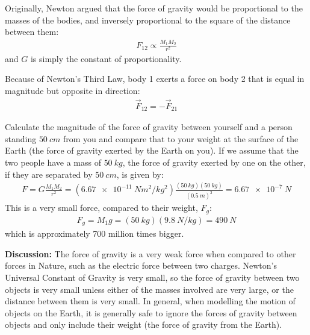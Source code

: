 Originally, Newton argued that the force of gravity would be proportional to the masses of the bodies, and inversely proportional to the square of the distance between them:
\begin{align*}
F_{12}\propto \frac{M_1M_2}{r^2}
\end{align*}
and $G$ is simply the constant of proportionality.

Because of Newton's Third Law, body 1 exerts a force on body 2 that is equal in magnitude but opposite in direction:
\begin{align*}
\vec F_{12} = -\vec F_{21}
\end{align*} 

\begin{example}{Calculate the magnitude of the force of gravity between yourself and a person standing $\SI{50}{cm}$ from you and compare that to your weight at the surface of the Earth (the force of gravity exerted by the Earth on you).}
If we assume that the two people have a mass of $\SI{50}{kg}$, the force of gravity exerted by one on the other, if they are separated by $\SI{50}{cm}$, is given by:
\begin{align*}
F=G\frac{M_1M_2}{r^2}=(\SI{6.67e-11}{Nm^2/kg^2})\frac{(\SI{50}{kg})(\SI{50}{kg})}{(\SI{0.5}{m})^2}=\SI{6.67e-7}{N}
\end{align*}
This is a very small force, compared to their weight, $F_g$:
\begin{align*}
F_g=M_1g=(\SI{50}{kg})(\SI{9.8}{N/kg})=\SI{490}{N}
\end{align*}
which is approximately 700 million times bigger. 

\textbf{Discussion:} The force of gravity is a very weak force when compared to other forces in Nature, such as the electric force between two charges. Newton's Universal Constant of Gravity is very small, so the force of gravity between two objects is very small unless either of the masses involved are very large, or the distance between them is very small. In general, when modelling the motion of objects on the Earth, it is generally safe to ignore the forces of gravity between objects and only include their weight (the force of gravity from the Earth). 
\end{example}


